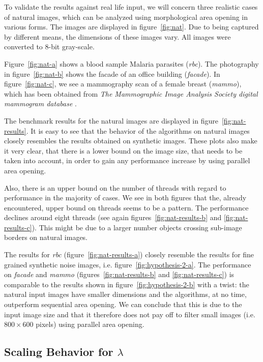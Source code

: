 To validate the results against real life input, we will concern three realistic
cases of natural images, which can be analyzed using morphological area opening
in various forms. The images are displayed in figure~\ref{fig:nat}. Due to being
captured by different means, the dimensions of these images vary. All images
were converted to 8-bit gray-scale.

Figure~\ref{fig:nat-a} shows a blood sample Malaria parasites
(\emph{rbc}). The photography in figure~\ref{fig:nat-b} shows the facade of an
office building (\emph{facade}). In figure~\ref{fig:nat-c}, we see a mammography
scan of a female breast (\emph{mammo}), which has been obtained from \emph{The
  Mammographic Image Analysis Society digital mammogram database}
\cite{Suckling1994Mammographic}.

The benchmark results for the natural images are displayed in
figure~\ref{fig:nat-results}. It is easy to see that the behavior of the
algorithms on natural images closely resembles the results obtained on synthetic
images. These plots also make it very clear, that there is a lower bound on the
image size, that needs to be taken into account, in order to gain any
performance increase by using parallel area opening.

Also, there is an upper bound on the number of threads with regard to
performance in the majority of cases. We see in both figures that the, already
encountered, upper bound on threads seems to be a pattern. The performance
declines around eight threads (see again figures~\ref{fig:nat-results-b} and
\ref{fig:nat-results-c}). This might be due to a larger number objects crossing
sub-image borders on natural images.

The results for \emph{rbc} (figure~\ref{fig:nat-results-a}) closely resemble the
results for fine grained synthetic noise images,
i.e. figure~\ref{fig:hypothesis-2-a}. The performance on \emph{facade} and
\emph{mammo} (figures~\ref{fig:nat-results-b} and \ref{fig:nat-results-c}) is
comparable to the results shown in figure~\ref{fig:hypothesis-2-b} with a twist:
the natural input images have smaller dimensions and the algorithms, at no time,
outperform sequential area opening. We can conclude that this is due to the
input image size and that it therefore does not pay off to filter small images
(i.e. $800 \times 600$ pixels) using parallel area opening.

\subsection{Scaling Behavior for $\lambda$}
\label{sec:experiments-ao-scale}

